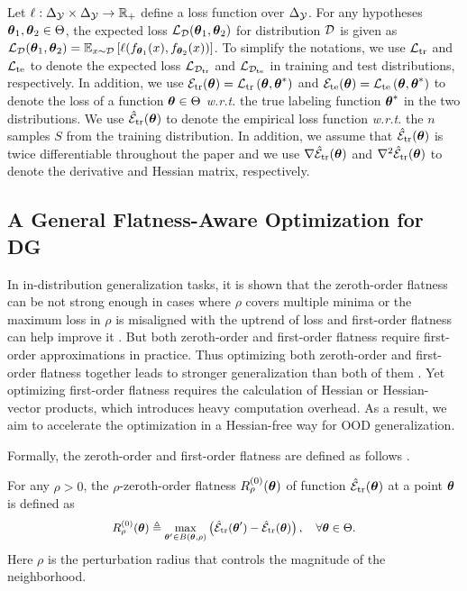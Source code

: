 Let $\ell: \Delta_{\mathcal{Y}} \times \Delta_{\mathcal{Y}} \rightarrow \mathbb{R}_{+}$ define a loss function over $\Delta_{\mathcal{Y}}$. For any hypotheses $\boldsymbol{\theta}_1, \boldsymbol{\theta}_2 \in \Theta$, the expected loss $\mathcal{L}_{\mathcal{D}}(\boldsymbol{\theta}_1, \boldsymbol{\theta}_2)$ for distribution $\mathcal{D}$ is given as $\mathcal{L}_{\mathcal{D}}(\boldsymbol{\theta}_1, \boldsymbol{\theta}_2) = \mathbb{E}_{x \sim \mathcal{D}}\left[\ell(f_{\boldsymbol{\theta}_1}(x), f_{\boldsymbol{\theta}_2}(x))\right]$. To simplify the notations, we use $\mathcal{L}_{\text{tr}}$ and $\mathcal{L}_{\text{te}}$ to denote the expected loss $\mathcal{L}_{\mathcal{D}_{\text{tr}}}$ and $\mathcal{L}_{\mathcal{D}_{\text{te}}}$ in training and test distributions, respectively. In addition, we use $\mathcal{E}_{{\text{tr}}}(\boldsymbol{\theta}) = \mathcal{L}_{{\text{tr}}}\left(\boldsymbol{\theta}, \boldsymbol{\theta}^*\right)$ and $\mathcal{E}_{{\text{te}}}(\boldsymbol{\theta}) = \mathcal{L}_{{\text{te}}}\left(\boldsymbol{\theta}, \boldsymbol{\theta}^*\right)$ to denote the loss of a function $\boldsymbol{\theta} \in \Theta$ \textit{w.r.t.} the true labeling function 
$\boldsymbol{\theta}^*$ in the two distributions. We use $\hat{\mathcal{E}}_{{\text{tr}}}(\boldsymbol{\theta})$ to denote the empirical loss function \textit{w.r.t.} the $n$ samples $S$ from the training distribution. In addition, we assume that $\hat{\mathcal{E}}_{{\text{tr}}}(\boldsymbol{\theta})$ is twice differentiable throughout the paper and we use $\nabla \hat{\mathcal{E}}_{{\text{tr}}}(\boldsymbol{\theta})$ and $\nabla^2 \hat{\mathcal{E}}_{{\text{tr}}}(\boldsymbol{\theta})$ to denote the derivative and Hessian matrix, respectively.

\subsection{A General Flatness-Aware Optimization for DG}

In in-distribution generalization tasks, it is shown that the zeroth-order flatness can be not strong enough in cases where $\rho$ covers multiple minima or the maximum loss in $\rho$ is misaligned with the uptrend of loss and first-order flatness can help improve it \cite{Zhang2023GradientNA}. 
But both zeroth-order and first-order flatness require first-order approximations in practice.
Thus optimizing both zeroth-order and first-order flatness together leads to stronger generalization than both of them \cite{Zhang2023GradientNA}. 
Yet optimizing first-order flatness requires the calculation of Hessian or Hessian-vector products, which introduces heavy computation overhead. As a result, we aim to accelerate the optimization in a Hessian-free way for OOD generalization.


Formally, the zeroth-order and first-order flatness are defined as follows \cite{foret2021sharpness,zhuang2022surrogate,Zhang2023GradientNA}.
\begin{definition} \label{defn:zeroth-order}
    For any $\rho > 0$, the $\rho$-zeroth-order flatness $R^{(0)}_{\rho}(\boldsymbol{\theta})$ of function $\hat{\mathcal{E}}_{{\text{tr}}}(\boldsymbol{\theta})$ at a point $\boldsymbol{\theta}$ is defined as
    \begin{equation} \label{eq:sam}
    \small
        R^{(0)}_{\rho}(\boldsymbol{\theta}) \triangleq \max_{\boldsymbol{\theta}' \in B(\boldsymbol{\theta}, \rho)} \left(\hat{\mathcal{E}}_{{\text{tr}}}(\boldsymbol{\theta}') - \hat{\mathcal{E}}_{{\text{tr}}}(\boldsymbol{\theta})\right), \quad \forall \boldsymbol{\theta} \in \Theta.
    \end{equation}
    Here $\rho$ is the perturbation radius that controls the magnitude of the neighborhood.
\end{definition}

